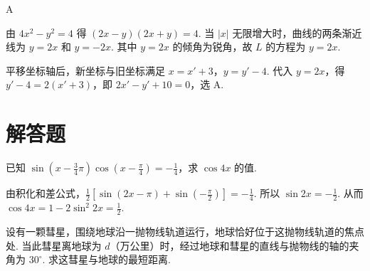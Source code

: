 \documentclass[UTF8,a4paper,oneside,11pt]{ctexbook}
\begin{document}
\begin{answer}
A
\end{answer}

\begin{solution}
由 \(4x^2-y^2=4\) 得 \((2x-y)(2x+y)=4\). 当 \(\lvert x\rvert\) 无限增大时，曲线的两条渐近线为 \(y=2x\) 和 \(y=-2x\). 其中 \(y=2x\) 的倾角为锐角，故 \(L\) 的方程为 \(y=2x\).

平移坐标轴后，新坐标与旧坐标满足 \(x=x'+3\)，\(y=y'-4\). 代入 \(y=2x\)，得 \(y'-4=2(x'+3)\)，即 \(2x'-y'+10=0\)，选 A.
\end{solution}

\section{解答题}

\begin{problem}
已知 \(\sin\left(x - \frac{3}{4}\pi\right)\cos\left(x - \frac{\pi}{4}\right) = -\frac{1}{4}\)，求 \(\cos 4x\) 的值.
\end{problem}

\begin{solution}
由积化和差公式，\(\frac{1}{2}\left[\sin(2x - \pi) + \sin\left(-\frac{\pi}{2}\right)\right] = -\frac{1}{4}\). 所以 \(\sin 2x = -\frac{1}{2}\). 从而 \(\cos 4x = 1 - 2\sin^2 2x = \frac{1}{2}\).
\end{solution}

\begin{problem}
设有一颗彗星，围绕地球沿一抛物线轨道运行，地球恰好位于这抛物线轨道的焦点处. 当此彗星离地球为 \(d\)（万公里）时，经过地球和彗星的直线与抛物线的轴的夹角为 \(30^{\circ}\). 求这彗星与地球的最短距离.
\end{problem}
\end{document}
